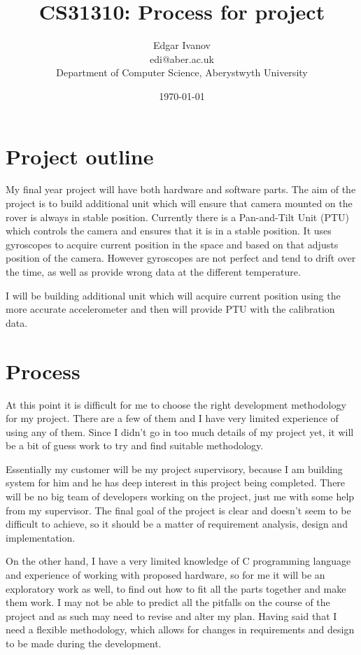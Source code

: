 \documentclass[]{report}
\begin{document}
\title{CS31310: Process for project}
\author{Edgar Ivanov\\ edi@aber.ac.uk \\ Department of Computer Science, Aberystwyth University}
\date{\today}
\maketitle
\section*{Project outline}
My final year project will have both hardware and software parts. The aim of the project is to build additional unit which will ensure that camera mounted on the rover is always in stable position. Currently there is a Pan-and-Tilt Unit (PTU) which controls the camera and ensures that it is in a stable position. It uses gyroscopes to acquire current position in the space and based on that adjusts position of the camera. However gyroscopes are not perfect and tend to drift over the time, as well as provide wrong data at the different temperature. 

I will be building additional unit which will acquire current position using the more accurate accelerometer and then will provide PTU with the calibration data.

\section*{Process}
At this point it is difficult for me to choose the right development methodology for my project. There are a few of them and I have very limited experience of using any of them. Since I didn't go in too much details of my project yet, it will be a bit of guess work to try and find suitable methodology.

Essentially my customer will be my project supervisory, because I am building system for him and he has deep interest in this project being completed. There will be no big team of developers working on the project, just me with some help from my supervisor. The final goal of the project is clear and doesn't seem to be difficult to achieve, so it should be a matter of requirement analysis, design and implementation.

On the other hand, I have a very limited knowledge of C programming language and experience of working with proposed hardware, so for me it will be an exploratory work as well, to find out how to fit all the parts together and make them work. I may not be able to predict all the pitfalls on the course of the project and as such may need to revise and alter my plan. Having said that I need a flexible methodology, which allows for changes in requirements and design to be made during the development. 
\end{document}
